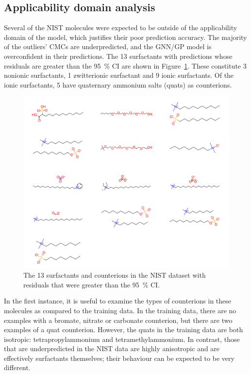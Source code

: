 \subsection{Applicability domain analysis}

Several of the NIST molecules were expected to be outside of the applicability
domain of the model, which justifies their poor prediction accuracy. The
majority of the outliers' CMCs are underpredicted, and the GNN/GP model is
overconfident in their predictions. The 13 surfactants with predictions whose
residuals are greater than the \SI{95}{\%} CI are shown in
Figure~\ref{fig:nist-underpred}. These constitute 3 nonionic surfactants, 1
zwitterionic surfactant and 9 ionic surfactants. Of the ionic surfactants, 5
have quaternary ammonium salts (quats) as counterions.

\begin{figure}
    \includegraphics[width=\textwidth]{images/nist-underpred.pdf}
    \caption{The 13 surfactants and counterions in the NIST dataset with residuals
    that were greater than the \SI{95}{\%} CI.}
    \label{fig:nist-underpred}
\end{figure}

In the first instance, it is useful to examine the types of counterions in these
molecules as compared to the training data. In the training data, there are no
examples with a bromate, nitrate or carbonate counterion, but there are two
examples of a quat counterion. However, the quats in the training data are both
isotropic: tetrapropylammonium and tetramethylammonium. In contrast, those that
are underpredicted in the NIST data are highly anisotropic and are effectively
surfactants themselves; their behaviour can be expected to be very different.

